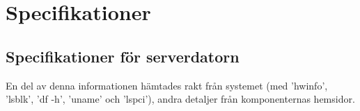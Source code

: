 \documentclass[journal,comsoc]{IEEEtran}
\begin{document}
%
\newpage
\appendices
\label{appendix:specs}
\section{Specifikationer}
\subsection{Specifikationer för serverdatorn}
En del av denna informationen hämtades rakt från systemet (med 'hwinfo', 'lsblk', 'df -h', 'uname' och 'lspci'), andra detaljer från komponenternas hemsidor.
\end{document}
